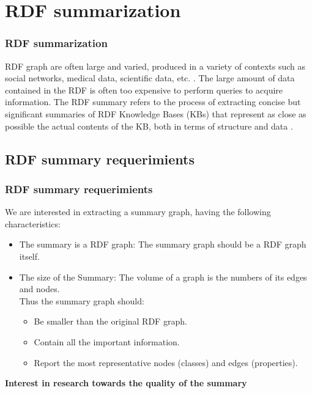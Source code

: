 \documentclass{beamer}
\numberwithin{figure}{section}
\numberwithin{equation}{section}
\begin{document}

\section{RDF summarization}
\begin{frame}
 \frametitle{RDF summarization}
 \justify \scriptsize

 RDF graph are often large and varied, produced in a variety of contexts such as social networks, medical data, scientific data, etc. \cite{Manolescu2018a}. The large amount of data contained in the RDF is often too expensive to perform queries to acquire information.
\vspace{3mm}
The RDF summary refers to the process of extracting concise but significant summaries of RDF Knowledge Bases (KBs) that represent as close as possible the actual contents of the KB, both in terms of structure and data \cite{Zneika2018}.

 \end{frame}
 

\subsection{RDF summary requerimients}
\begin{frame} 
 \frametitle{RDF summary requerimients}
 \normalsize We are interested in extracting a summary graph, having the following characteristics:
 \vspace{5mm}
  \begin{itemize} \scriptsize
  	\item \justify The summary is a RDF graph: The summary graph should be a RDF graph itself.
    \vspace{2mm}
  	\item \justify The size of the Summary: The volume of a graph is the numbers of its edges and nodes.   
    		\\Thus the summary graph should:
    \vspace{2mm}
  		\begin{itemize}	\scriptsize
    		\item \justify Be smaller than the original RDF graph.
    		\vspace{2mm}
    		\item Contain all the important information.
            \vspace{2mm}
  			\item Report the most representative nodes (classes) and edges (properties).
 		\end{itemize}
  \end{itemize}

\centering 
\vspace{5 mm}\normalsize
\textbf{Interest in research towards the quality of the summary\cite{Khatchadourian2010}\cite{Zneika2018}}
 
\end{frame}
\end{document}
